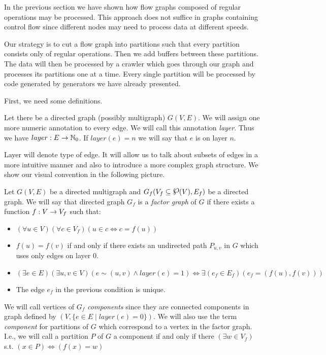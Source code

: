 
In the previous section we have shown how flow graphs composed of regular operations may be processed. This approach does not suffice in graphs containing control flow since different nodes may need to process data at different speeds. 

Our strategy is to cut a flow graph into partitions such that every partition consists only of regular operations. Then we add buffers between these partitions. The data will then be processed by a crawler which  goes through our graph and processes its partitions one at a time. Every single partition will be processed by code generated by generators we have already presented. 

First, we need some definitions.

\begin{define}
  Let there be a directed graph (possibly multigraph) $G(V,E)$. We will assign one more numeric annotation to every edge. We will call this annotation \emph{layer}. Thus we have $layer: E \rightarrow \mathbb{N}_0$. If $layer(e) = n$ we will say that $e$ is on layer $n$. 
\end{define}

Layer will denote type of edge. It will allow us to talk about subsets of edges in a more intuitive manner and also to introduce a more complex graph structure. We show our visual convention in the following picture.


\begin{define}
  Let $G(V,E)$ be a directed multigraph and $G_f(V_f \subseteq \powerset(V),E_f)$ be a directed graph. We will say that directed graph $G_f$ is a \emph{factor graph} of $G$ if there exists a function $f: V \rightarrow V_f$ such that:
  \begin{itemize}
    \item $(\forall u \in V)(\forall c \in V_f)( u \in c \Longleftrightarrow c = f(u)) $
    \item $f(u) = f(v)$ if and only if there exists an undirected path $P_{u,v}$ in $G$ which uses only edges on layer 0.
    \item $(\exists e \in E)(\exists u,v \in V)(e \sim (u,v) \land layer(e) = 1) \Longleftrightarrow \exists(e_f \in E_f)( e_f = (f(u), f(v)) )$  
    \item The edge $e_f$ in the previous condition is unique.
  \end{itemize}
  We will call vertices of $G_f$ \emph{components} since they are connected components in graph defined by $(V, \{e \in E \mid layer(e) = 0 \})$. We will also use the term \emph{component} for partitions of $G$ which correspond to a vertex in the factor graph. I.e., we will call a partition $P$ of $G$ a component if and only if there $(\exists w \in V_f)$ s.t. $(x \in P) \Longleftrightarrow ( f(x) = w)$
\end{define}

